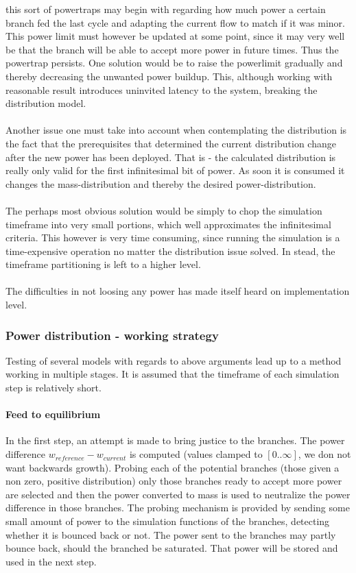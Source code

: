 this sort of powertraps may begin with regarding how much power a certain
branch fed the last cycle and adapting the current flow to match if it was
minor. This power limit must however be updated at some point,
since it may very well be that the branch will be able to accept more power
in future times. Thus the powertrap persists. One solution would be to raise
the powerlimit gradually and thereby decreasing the unwanted power buildup.
This, although working with reasonable result introduces uninvited latency to
the system, breaking the distribution model.
\\\\
Another issue one must take into account when contemplating the distribution
is the fact that the prerequisites that determined the current distribution 
change after the new power has been deployed. That is - the calculated
distribution is really only valid for the first infinitesimal bit of power. As
soon it is consumed it changes the mass-distribution and thereby the desired
power-distribution.
\\\\
The perhaps most obvious solution would be simply to chop the simulation
timeframe into very small portions, which well approximates the infinitesimal
criteria. This however is very time consuming, since running the simulation is
a time-expensive operation no matter the distribution issue solved. In stead,
the timeframe partitioning is left to a higher level.
\\\\
The difficulties in not loosing any power has made itself heard on
implementation level.

\subsubsection{Power distribution - working strategy}
Testing of several models with regards to above arguments lead up to a method
working in multiple stages. It is assumed that the timeframe of each
simulation step is relatively short.
\paragraph{Feed to equilibrium}
In the first step, an attempt is made to bring justice to the branches. The
power difference $w_{reference} - w_{current}$ is computed (values clamped to
$[0..\infty]$, we don not want backwards growth). Probing each of the
potential branches (those given a non zero, positive distribution) only those
branches ready to accept more power are selected and then the power
converted to mass is used to neutralize the power difference in those
branches. The probing mechanism is provided by sending some small amount of
power to the simulation functions of the branches, detecting whether it
is bounced back or not. The power sent to the branches may partly bounce back,
should the branched be saturated. That power will be stored and used in the
next step.
